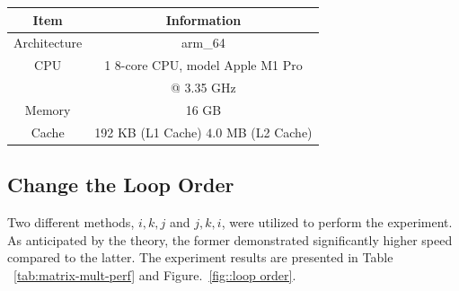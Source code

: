 \documentclass[conference]{IEEEtran}
\begin{document}
\begin{table}[htbp]
\begin{minipage}[t]{\linewidth}
 			\label{tab:system_config3}
 			\setlength\extrarowheight{2pt}
 			\begin{tabular}{|c|c|}
 				\hline
 				Item & Information \\ \hline
 				Architecture & arm\_64 \\ \hline
 				CPU & 1 $8$-core CPU, model Apple M1 Pro \\ 
 				& @ 3.35 GHz \\ \hline
 				Memory & 16 GB \\ \hline
 				Cache & 192 KB (L1 Cache) $4.0$ MB (L2 Cache) \\ \hline
 			\end{tabular}
 		\end{minipage}	
	\end{table}

	
	\subsection{Change the Loop Order}
	
	Two different methods, $i,k,j$ and $j,k,i$, were utilized to perform the experiment. As anticipated by the theory, the former demonstrated significantly higher speed compared to the latter. The experiment results are presented in Table ~\ref{tab:matrix-mult-perf} and Figure.~\ref{fig::loop order}.
	
\end{document}
